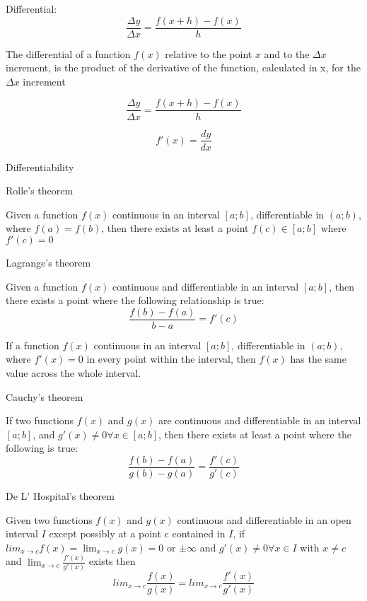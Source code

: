 \documentclass{article}
\begin{document}
Differential:
\begin{equation}
\frac{\Delta y}{\Delta x} = \frac{f(x+h)-f(x)}{h}
\end{equation}

The differential of a function $f(x)$ relative to the point $x$ and to the $\Delta x$ increment, is the product of the derivative of the function, calculated in x, for the $\Delta x$ increment

\begin{equation}
\frac{\Delta y}{\Delta x} = \frac{f(x+h)-f(x)}{h}
\end{equation}

\begin{equation}
f'(x) = \frac{dy}{dx}
\end{equation}

Differentiability


Rolle's theorem

Given a function $f(x)$ continuous in an interval $[a;b]$, differentiable in $(a; b)$, where $f(a) = f(b)$, then there exists at least a point $f(c) \in [a; b]$ where $f'(c) = 0$

Lagrange's theorem

Given a function $f(x)$ continuous and differentiable in an interval $[a;b]$, then there exists a point where the following relationship is true:
\begin{equation}
\frac{f(b)-f(a)}{b-a} = f'(c)
\end{equation}

If a function $f(x)$ continuous in an interval $[a;b]$, differentiable in $(a; b)$, where $f'(x) = 0$ in every point within the interval, then $f(x)$ has the same value across the whole interval.

Cauchy's theorem

If two functions $f(x)$ and $g(x)$ are continuous and differentiable in an interval $[a;b]$, and $g'(x)\neq 0 \forall x \in [a;b]$, then there exists at least a point where the following is true:
\begin{equation}
\frac{f(b)-f(a)}{g(b)-g(a)} = \frac{f'(c)}{g'(c)}
\end{equation}

De L' Hospital's theorem

Given two functions $f(x)$ and $g(x)$ continuous and differentiable in an open interval $I$ except possibly at a point c contained in $I$, if $lim_{x\to c} f(x) = \lim_{x\to c} g(x) = 0$ or $\pm\infty$ and $g'(x)\neq 0 \forall x \in I$ with $x\neq c$ and $\lim_{x\to c} \frac{f'(x)}{g'(x)}$ exists then
\begin{equation}
lim_{x\to c}\frac{f(x)}{g(x)} = lim_{x\to c}\frac{f'(x)}{g'(x)}
\end{equation}
\end{document}
